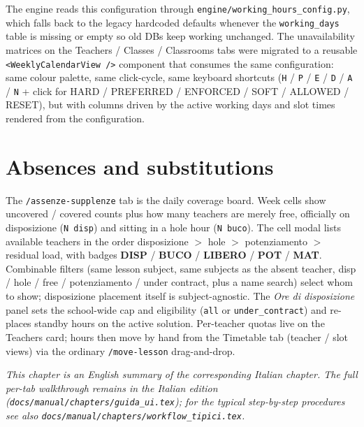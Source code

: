 The engine reads this configuration through
\texttt{engine/working\_hours\_config.py}, which falls back to
the legacy hardcoded defaults whenever the \texttt{working\_days}
table is missing or empty so old DBs keep working unchanged.
The unavailability matrices on the Teachers / Classes /
Classrooms tabs were migrated to a reusable
\texttt{<WeeklyCalendarView />} component that consumes the same
configuration: same colour palette, same click-cycle, same
keyboard shortcuts
(\texttt{H} / \texttt{P} / \texttt{E} / \texttt{D} / \texttt{A} /
\texttt{N} + click for HARD / PREFERRED / ENFORCED / SOFT /
ALLOWED / RESET), but with columns driven by the active working
days and slot times rendered from the configuration.

\section*{Absences and substitutions}

The \texttt{/assenze-supplenze} tab is the daily coverage
board. Week cells show uncovered / covered counts plus how
many teachers are merely free, officially on disposizione
(\texttt{N disp}) and sitting in a hole hour
(\texttt{N buco}). The cell modal lists available teachers
in the order disposizione $>$ hole $>$ potenziamento $>$ residual
load, with badges \textbf{DISP} / \textbf{BUCO} /
\textbf{LIBERO} / \textbf{POT} / \textbf{MAT}. Combinable
filters (same lesson subject, same subjects as the absent
teacher, disp / hole / free / potenziamento / under contract,
plus a name search) select whom to show; disposizione
placement itself is subject-agnostic. The \emph{Ore di
disposizione} panel sets the school-wide cap and eligibility
(\texttt{all} or \texttt{under\_contract}) and re-places
standby hours on the active solution. Per-teacher quotas live
on the Teachers card; hours then move by hand from the
Timetable tab (teacher / slot views) via the ordinary
\texttt{/move-lesson} drag-and-drop.

\medskip
\noindent
\textit{This chapter is an English summary of the corresponding Italian chapter. The full per-tab walkthrough remains in the Italian edition (\texttt{docs/manual/chapters/guida\_ui.tex}); for the typical step-by-step procedures see also \texttt{docs/manual/chapters/workflow\_tipici.tex}.}
